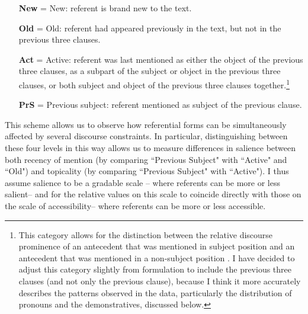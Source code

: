 \begin{itemize}
\item[\textbf{New}] = New: referent is brand new to the text.

\item[\textbf{Old}] = Old: referent had appeared previously in the text, but not in the previous three clauses.

\item[\textbf{Act}] = Active: referent was last mentioned as either the object of the previous three clauses, as a subpart of the subject or object in the previous three clauses, or both subject and object of the previous three clauses together.\footnote{This category allows for the distinction between the relative discourse prominence of an antecedent that was mentioned in subject position and an antecedent that was mentioned in a non-subject position \citep[226]{arnold2003}. I have decided to adjust this category slightly from \citet[231]{arnold2003} formulation to include the previous three clauses (and not only the previous clause), because I think it more accurately describes the patterns observed in the data, particularly the distribution of pronouns and the demonstratives, discussed below.}

\item[\textbf{PrS}] = Previous subject: referent mentioned as subject of the previous clause.
\end{itemize}

\z
This scheme allows us to observe how referential forms can be simultaneously affected by several discourse constraints. In particular, distinguishing between these four levels in this way allows us to measure differences in salience between both recency of mention (by comparing ``Previous Subject" with ``Active" and ``Old") and topicality (by comparing ``Previous Subject" with ``Active"). I thus assume salience to be a gradable scale \citep{hopper1980}-- where referents can be more or less salient-- and for the relative values on this scale to coincide directly with those on the scale of accessibility-- where referents can be more or less accessible. 

